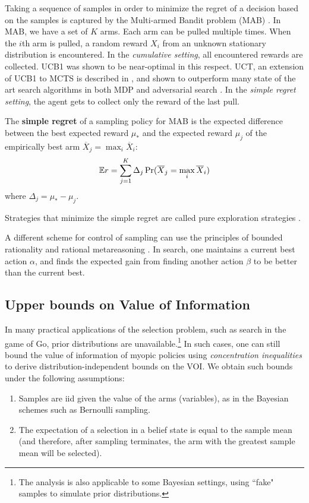 Taking a sequence of samples in order to minimize the regret of a
decision based on the samples is captured by the Multi-armed Bandit
problem (MAB) \cite{Vermorel.bandits}. In MAB, we have a set of $K$
arms. Each arm can be pulled multiple times. When the $i$th arm is
pulled, a random reward $X_i$ from an unknown stationary distribution
is encountered. In the \textit{cumulative setting}, all encountered rewards are
collected.  UCB1 \cite{Auer.ucb} was shown to be
near-optimal in this respect. UCT, an extension of UCB1 to MCTS is
described in \cite{Kocsis.uct}, and shown to outperform many state of
the art search algorithms in both MDP and adversarial search
\cite{Gelly.mogo,Eyerich.ctp}. In the \textit{simple regret setting}, the agent
gets to collect only the reward of the last pull.
\begin{dfn}
The \textbf{simple regret} of a sampling policy for MAB
is the expected difference between the best expected reward
$\mu_*$ and the expected reward $\mu_j$ of the empirically best arm
$\overline X_j=\max_i\overline X_i$:
\begin{equation}
\IE r=\sum_{j=1}^K\Delta_j\Pr(\overline X_j=\max_i\overline X_i)
\label{eqn:simple-regret}
\vspace{-8pt}
\end{equation}
where $\Delta_j=\mu_*-\mu_j$.
\end{dfn}
Strategies that minimize the simple regret are called pure exploration
strategies \cite{Bubeck.pure}. 

A different scheme for control of sampling can use the principles of
bounded rationality \cite{Horvitz.reasoningabout} and rational
metareasoning \cite{Russell.right}.  In search, one
maintains a current best action $\alpha$, and finds the expected gain
from finding another action $\beta $ to be better than the current
best.

\subsection{Upper bounds on Value of Information}\label{approx-nonbayesian-section}


In many practical applications of the selection problem, such as search in
the game of Go, prior distributions are unavailable.\footnote{The analysis is also applicable to
some Bayesian settings, using ``fake" samples to simulate prior distributions.}
In such cases, one can still bound
the value of information of myopic policies using {\em concentration
inequalities} to derive distribution-independent bounds on the
VOI. We obtain such bounds under the
following assumptions:
\begin{enumerate}
\item Samples are iid given the value of the arms (variables), as in the Bayesian schemes such as Bernoulli
sampling.
\item The expectation of a selection in a belief state is equal to the sample mean (and therefore,
   after sampling terminates, the arm with the greatest sample mean will be selected).
\end{enumerate}


